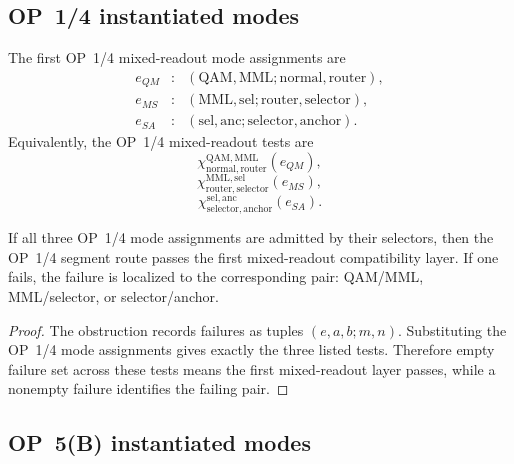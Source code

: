 \subsection{OP~1/4 instantiated modes}
\label{subsec:v410r20-op14-instantiated-modes}

\begin{definition}
\label{def:v410r20-op14-mode-assignments}
The first OP~1/4 mixed-readout mode assignments are
\[
\begin{array}{rcl}
e_{QM} &:&
(\mathrm{QAM},\mathrm{MML};
 \mathrm{normal},\mathrm{router}),\\
e_{MS} &:&
(\mathrm{MML},\mathrm{sel};
 \mathrm{router},\mathrm{selector}),\\
e_{SA} &:&
(\mathrm{sel},\mathrm{anc};
 \mathrm{selector},\mathrm{anchor}).
\end{array}
\]
Equivalently, the OP~1/4 mixed-readout tests are
\[
 \chi^{\mathrm{QAM},\mathrm{MML}}_{\mathrm{normal},\mathrm{router}}(e_{QM}),
\]
\[
 \chi^{\mathrm{MML},\mathrm{sel}}_{\mathrm{router},\mathrm{selector}}(e_{MS}),
\]
\[
 \chi^{\mathrm{sel},\mathrm{anc}}_{\mathrm{selector},\mathrm{anchor}}(e_{SA}).
\]
\end{definition}

\begin{proposition}
\label{prop:v410r20-op14-first-mode-diagnostic}
If all three OP~1/4 mode assignments are admitted by their selectors, then the
OP~1/4 segment route passes the first mixed-readout compatibility layer.
If one fails, the failure is localized to the corresponding pair:
QAM/MML, MML/selector, or selector/anchor.
\end{proposition}

\begin{proof}
The obstruction records failures as tuples \((e,a,b;m,n)\). Substituting
the OP~1/4 mode assignments gives exactly the three listed tests. Therefore
empty failure set across these tests means the first mixed-readout layer passes,
while a nonempty failure identifies the failing pair.
\end{proof}

\subsection{OP~5(B) instantiated modes}
\label{subsec:v410r20-op5b-instantiated-modes}

